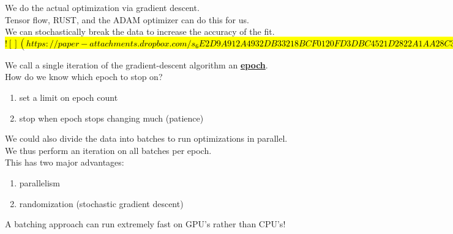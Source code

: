 \documentclass[../../lecture_notes.tex]{subfiles}
\begin{document}
\noindent We do the actual optimization via gradient descent.\\
Tensor flow, RUST, and the ADAM optimizer can do this for us.\\
We can stochastically break the data to increase the accuracy of the fit.\\

\hl{
$![](https://paper-attachments.dropbox.com/s_6E2D9A912A4932DB33218BCF0120FD3DBC4521D2822A1AA28C3A628B5392148D_1591134328128_Untitled+drawing+8.jpg)$
}

\noindent We call a single iteration of the gradient-descent algorithm an \textbf{\underline{epoch}}.\\
How do we know which epoch to stop on?\\
	\begin{enumerate} [itemsep=0mm]
		\item set a limit on epoch count
		\item stop when epoch stops changing much (patience)
	\end{enumerate} \medskip

\noindent We could also divide the data into batches to run optimizations in parallel.\\
We thus perform an iteration on all batches per epoch.\\
This has two major advantages:
	\begin{enumerate} [itemsep=0mm]
		\item parallelism
		\item randomization (stochastic gradient descent)
	\end{enumerate}
\noindent A batching approach can run extremely fast on GPU’s rather than CPU’s!
\end{document}
